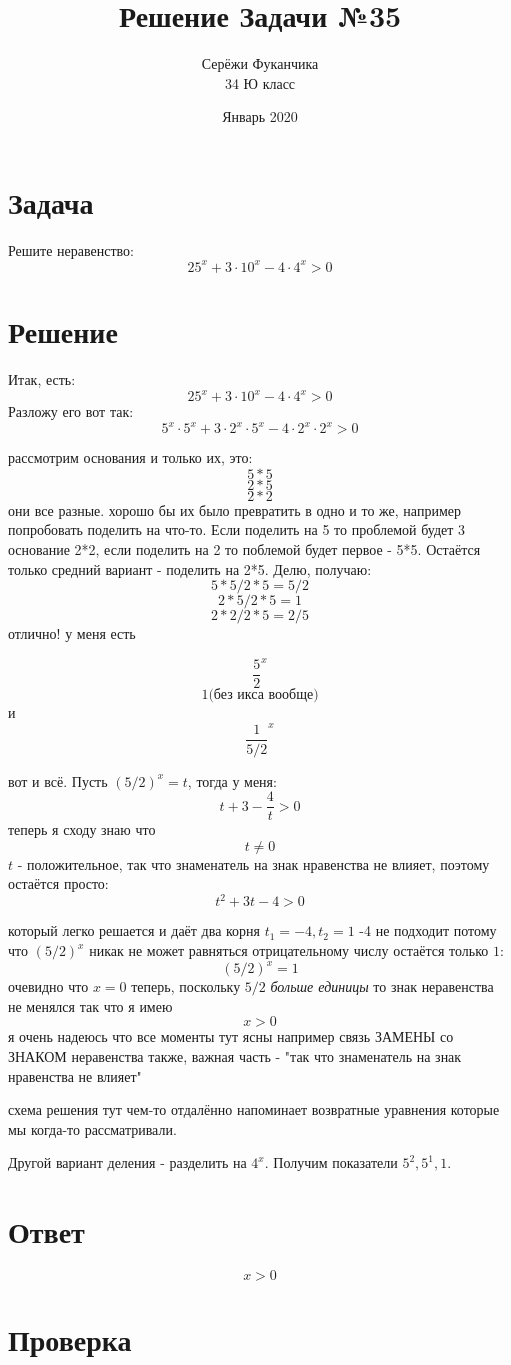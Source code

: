 \documentclass{article}
\title{Решение Задачи №35}
\author{Серёжи Фуканчика\\34 Ю класс}
\date{Январь 2020}
\begin{document}
\maketitle

\section{Задача}
Решите неравенство:
$$25^x+3\cdot{}10^x-4\cdot{}4^x>0$$

\section{Решение}
Итак, есть:
$$25^x+3\cdot{}10^x-4\cdot{}4^x>0$$
Разложу его вот так:
$$5^x\cdot{}5^{x}+3\cdot{}2^x\cdot{}5^x-4\cdot{}2^x\cdot{}2^x>0$$

рассмотрим основания и только их, это:
$$5*5$$
$$2*5$$
$$2*2$$
они все разные. хорошо бы их было превратить в одно и то же, например попробовать поделить на что-то. Если поделить на 5 то проблемой будет 3 основание 2*2, если поделить на 2 то поблемой будет первое - 5*5. Остаётся только средний вариант - поделить на 2*5. Делю, получаю:
$$5*5/2*5=5/2$$
$$2*5/2*5=1$$
$$2*2/2*5=2/5$$
отлично! у меня есть
\begin{samepage}
$$\frac{5}{2}^x$$
$$1 \textrm{(без икса вообще)}$$
и 
$$\frac{1}{5/2}^x$$
\end{samepage}
вот и всё. Пусть $(5/2)^x=t$, тогда у меня:
$$t+3-\frac{4}{t}>0$$
теперь я сходу знаю что
$$t\ne{}0$$
$t$ - положительное, так что знаменатель на знак нравенства не влияет, поэтому остаётся просто:
$$t^2+3t-4>0$$

который легко решается и даёт два корня
$t_1=-4, t_2=1$ -4 не подходит потому что $(5/2)^x$ никак не может равняться отрицательному числу остаётся только $1$:
$$(5/2)^x=1$$
очевидно что $x=0$ теперь, поскольку $5/2$ \textit{больше единицы} то знак неравенства не менялся так что я имею
$$x>0$$
я очень надеюсь что все моменты тут ясны
например связь ЗАМЕНЫ со ЗНАКОМ неравенства
также, важная часть - "так что знаменатель на знак нравенства не влияет"

схема решения тут чем-то отдалённо напоминает возвратные уравнения которые мы когда-то рассматривали.

Другой вариант деления - разделить на $4^x$. Получим показатели $5^2, 5^1, 1$.

\section{Ответ}
$$x>0$$

\section{Проверка}
\end{document}
